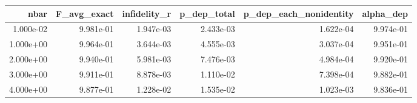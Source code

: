 \begin{tabular}{rrrrrr}
\toprule
nbar & F_avg_exact & infidelity_r & p_dep_total & p_dep_each_nonidentity & alpha_dep \\
\midrule
1.000e-02 & 9.981e-01 & 1.947e-03 & 2.433e-03 & 1.622e-04 & 9.974e-01 \\
1.000e+00 & 9.964e-01 & 3.644e-03 & 4.555e-03 & 3.037e-04 & 9.951e-01 \\
2.000e+00 & 9.940e-01 & 5.981e-03 & 7.476e-03 & 4.984e-04 & 9.920e-01 \\
3.000e+00 & 9.911e-01 & 8.878e-03 & 1.110e-02 & 7.398e-04 & 9.882e-01 \\
4.000e+00 & 9.877e-01 & 1.228e-02 & 1.535e-02 & 1.023e-03 & 9.836e-01 \\
\bottomrule
\end{tabular}
